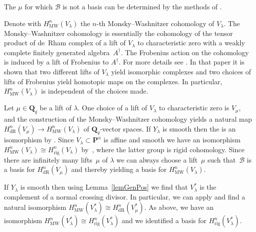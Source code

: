 \documentclass[pdftex]{sigma}
\numberwithin{equation}{section}
\DeclareMathOperator{\rig}{rig}
\DeclareMathOperator{\dR}{dR}
\DeclareMathOperator{\MW}{MW}
\begin{document}
\begin{Remark} The $\mu$ for which $\mathcal{B}$ is not a basis can be determined by the methods of \cite[Section~3]{PanTui}.
\end{Remark}

\begin{Remark}Denote with $H^n_{\MW}(V_{\lambda})$ the $n$-th Monsky--Washnitzer cohomology of $V_\lambda$. The Monsky--Washnitzer cohomology is essentially the cohomology of the tensor product of de~Rham complex of a lift of $V_{\lambda}$ to characteristic zero with a weakly complete f\/initely generated algebra~$A^{\dagger}$. The Frobenius action on the cohomology is induced by a lift of Frobenius to $A^{\dagger}$. For more details see \cite[Theorem~2.4.5]{PutMW}. In that paper it is shown that two dif\/ferent lifts of $V_{\lambda}$ yield isomorphic complexes and two choices of lifts of Frobenius yield homotopic maps on the complexes. In particular, $H^n_{\MW}(V_\lambda)$ is independent of the choices made.

Let $\mu\in \mathbf{Q}_q$ be a lift of $\lambda$. One choice of a lift of $V_\lambda$ to characteristic zero is $V_{\mu}$, and the construction of the Monsky--Washnitzer cohomology yields a natural map $H^n_{\dR}(V_\mu)\to H^n_{\MW}(V_\lambda)$ of $\mathbf{Q}_q$-vector spaces. If $Y_\lambda$ is smooth then the is an isomorphism by \cite{BalChi}. Since $V_\lambda \subset \mathbf{P}^n$ is af\/f\/ine and smooth we have an isomorphism $H^n_{\MW}(V_\lambda)\cong H^n_{\rig}(V_\lambda)$ by~\cite{BerSMF}, where the latter group is rigid cohomology. Since there are inf\/initely many lifts~$\mu$ of $\lambda$ we can always choose a lift~$\mu$ such that~$\mathcal{B}$ is a basis for $H^n_{\dR}(V_\mu)$ and thereby yielding a basis for $H^n_{\MW}(V_{\lambda})$.

If $Y_\lambda$ is smooth then using Lemma~\ref{lemGenPos} we f\/ind that $V_\lambda^*$ is the complement of a normal crossing divisor. In particular, we can apply \cite{BalChi} and f\/ind a natural isomorphism $H^n_{\MW}(V_\lambda^*)\cong H^n_{\dR}(V_\mu^*)$. As above, we have an isomorphism $H^n_{\MW}(V_\lambda^*)\cong H^n_{\rig}(V_\lambda^*)$ and we identif\/ied a basis for $H^n_{\rig}(V_\lambda^*)$.
\end{Remark}
\end{document}

